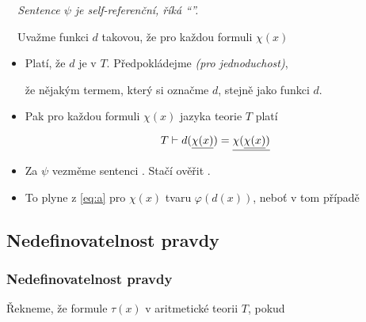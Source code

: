     {\it {}\ \ Sentence $\psi$ je self-referenční, říká \emph{``''.}}
    \medskip
    
    \ \ Uvažme  funkci $d$ takovou, že pro každou formuli $\chi(x)$
    
    
    
    \begin{itemize}
    \item Platí, že $d$ je  v $T$. Předpokládejme \emph{(pro jednoduchost)},
    \smallskip
    
    že nějakým termem, který si označme $d$, stejně jako funkci $d$.
    \smallskip
    
    \item Pak pro každou formuli $\chi(x)$ jazyka teorie $T$ platí
    
    \begin{equation}\label{eq:a}{T\vdash d(\underline{\chi(x)})=\underline{\chi(\underline{\chi(x)})}}\end{equation}
    
    
    \item Za $\psi$ vezměme sentenci . Stačí ověřit .
    \smallskip
    
    \item To plyne z \eqref{eq:a} pro $\chi(x)$ tvaru $\varphi(d(x))$, neboť v tom případě
    
    
    
    \end{itemize}
    
    
    \subsection*{Nedefinovatelnost pravdy}
    \subsubsection*{Nedefinovatelnost pravdy}
    
    Řekneme, že formule $\tau(x)$  v aritmetické teorii $T$, pokud
    \smallskip
    
